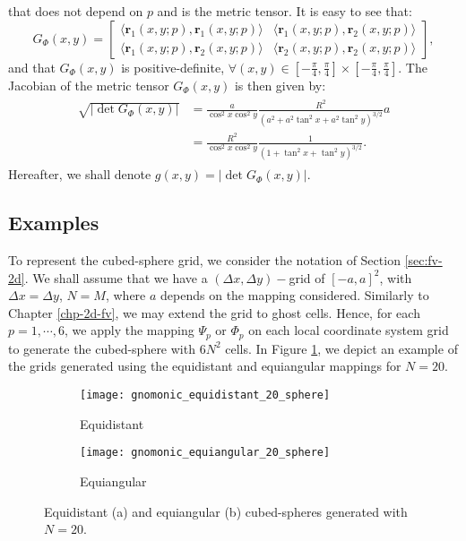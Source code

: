 that does not depend on $p$ and is the  metric tensor.
It is easy to see that:
\begin{equation}
	\label{chp3-eqangle-phi-metric-tensor}
	G_{\Phi}(x,y) = 
	\begin{bmatrix}
		\langle \boldsymbol{r}_{1}(x,y;p), \boldsymbol{r}_{1}(x,y;p) \rangle & 
		\langle \boldsymbol{r}_{1}(x,y;p), \boldsymbol{r}_{2}(x,y;p) \rangle \\
		\langle \boldsymbol{r}_{1}(x,y;p), \boldsymbol{r}_{2}(x,y;p) \rangle  &
		\langle \boldsymbol{r}_{2}(x,y;p), \boldsymbol{r}_{2}(x,y;p) \rangle 
	\end{bmatrix},
\end{equation}
and that $G_{\Phi}(x,y)$ is positive-definite, 
$\forall (x,y) \in [-\frac{\pi}{4},\frac{\pi}{4}] 
\times [-\frac{\pi}{4},\frac{\pi}{4}]$.
The Jacobian of the metric tensor $G_{\Phi}(x,y)$ is then given by:
\begin{align}
	\label{metrictensor-cs-equiangular}
	\begin{split}
		\sqrt{|\det{G_{\Phi}(x,y)}|} &= \frac{a}{\cos^2 x \cos^2 y}
		\frac{R^2}{(a^2 + a^2\tan^2x + a^2\tan^2y)^{3/2}}a\\
		&= \frac{R^2}{\cos^2 x \cos^2 y}
		\frac{1}{(1 + \tan^2x + \tan^2y)^{3/2}}.
	\end{split}
\end{align}
Hereafter, we shall denote $g(x,y) = |\det{G_{\Phi}(x,y)}|$.
\subsection{Examples}
To represent the cubed-sphere grid, we consider the notation of Section \ref{sec:fv-2d}.
We shall assume that we have a $(\Delta x, \Delta y)-$grid of $[-a,a]^2$, with $\Delta x= \Delta y$, $N=M$,
where $a$ depends on the mapping considered.
Similarly to Chapter \ref{chp-2d-fv}, we may extend the grid to ghost cells.
Hence, for each $p=1, \cdots, 6$, we apply the mapping $\Psi_p$ or $\Phi_p$ on
each local coordinate system grid to generate the cubed-sphere with $6N^2$ cells.
In Figure \ref{chp4-cs-grid}, we depict an example of the grids generated using 
the equidistant and equiangular mappings for $N=20$.
\begin{figure}[!htb]
	\centering
	\begin{subfigure}{0.48\textwidth}
		\centering
		\texttt{[image: gnomonic\_equidistant\_20\_sphere]}
		\caption{Equidistant}
	\end{subfigure}
	\begin{subfigure}{0.48\textwidth}
		\centering
		\texttt{[image: gnomonic\_equiangular\_20\_sphere]}
		\caption{Equiangular}
	\end{subfigure}
	\caption{Equidistant (a) and equiangular (b) cubed-spheres generated with $N=20$.
		\label{chp4-cs-grid}}
\end{figure}

